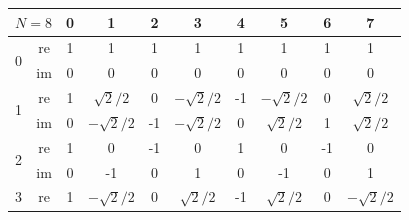 \begin{center}
	\begin{tabular}{| c c c c c c c c c c |}
		\hline
		\multicolumn{2}{|c}{$N=8$} & \multicolumn{1}{c}{ \tiny 0} & \multicolumn{1}{c}{ \tiny 1} & \multicolumn{1}{c}{ \tiny 2} & \multicolumn{1}{c}{ \tiny 3} & \multicolumn{1}{c}{ \tiny 4} & \multicolumn{1}{c}{ \tiny 5} & \multicolumn{1}{c}{ \tiny 6} & \multicolumn{1}{c|}{ \tiny 7}                 \\
		\hline
		\hline
		\multirow{2}{*}{0}         & re                           & 1                            & 1                            & 1                            & 1                            & 1                            & 1                            & 1                             & 1             \\
		                           & im                           & 0                            & 0                            & 0                            & 0                            & 0                            & 0                            & 0                             & 0             \\
		\hline\hline
		\multirow{2}{*}{1}         & re                           & 1                            & $\sqrt{2}/2$                 & 0                            & $-\sqrt{2}/2$                & -1                           & $-\sqrt{2}/2$                & 0                             & $\sqrt{2}/2$  \\
		                           & im                           & 0                            & $-\sqrt{2}/2$                & -1                           & $-\sqrt{2}/2$                & 0                            & $\sqrt{2}/2$                 & 1                             & $\sqrt{2}/2$  \\
		\hline\hline
		\multirow{2}{*}{2}         & re                           & 1                            & 0                            & -1                           & 0                            & 1                            & 0                            & -1                            & 0             \\
		                           & im                           & 0                            & -1                           & 0                            & 1                            & 0                            & -1                           & 0                             & 1             \\
		\hline\hline
		\multirow{2}{*}{3}         & re                           & 1                            & $-\sqrt{2}/2$                & 0                            & $\sqrt{2}/2$                 & -1                           & $\sqrt{2}/2$                 & 0                             & $-\sqrt{2}/2$ \\

\end{tabular}
\end{center}
